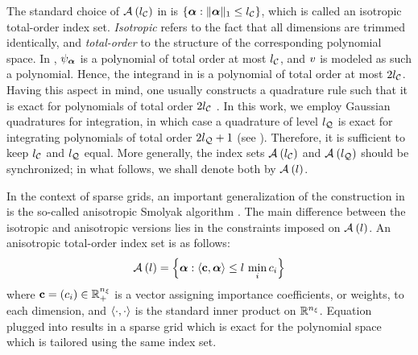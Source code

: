The standard choice of $\multiindexSet{\nclevel}$ in  is $\{ \multiindex: \norm[1]{\multiindex} \leq \nclevel \}$, which is called an isotropic total-order index set.
\emph{Isotropic} refers to the fact that all dimensions are trimmed identically, and \emph{total-order} to the structure of the corresponding polynomial space.
In , $\polynomial_{\multiindex}$ is a polynomial of total order at most $\nclevel$, and $\w$ is modeled as such a polynomial.
Hence, the integrand in  is a polynomial of total order at most $2 \nclevel$.
Having this aspect in mind, one usually constructs a quadrature rule such that it is exact for polynomials of total order $2 \nclevel$ \cite{eldred2008}.
In this work, we employ Gaussian quadratures for integration, in which case a quadrature of level $\nqlevel$ is exact for integrating polynomials of total order $2 \nqlevel + 1$ (see ).
Therefore, it is sufficient to keep $\nclevel$ and $\nqlevel$ equal.
More generally, the index sets $\multiindexSet{\nclevel}$ and $\multiindexSet{\nqlevel}$ should be synchronized; in what follows, we shall denote both by $\multiindexSet{\level}$.

In the context of sparse grids, an important generalization of the construction in  is the so-called anisotropic Smolyak algorithm \cite{nobile2008}.
The main difference between the isotropic and anisotropic versions lies in the constraints imposed on $\quadratureMultiindexSet{\level}$.
An anisotropic total-order index set is as follows:
\begin{equation} \elab{anisotropic-total-order-index-set}
  \chaosMultiindexSet{\level} = \left\{ \multiindex: \innerProduct{\dimensionAnisotropy, \multiindex} \leq \level \, \min_i c_i \right\}
\end{equation}
where $\dimensionAnisotropy = (c_i) \in \real^\nvars_+$ is a vector assigning importance coefficients, or weights, to each dimension, and $\innerProduct{\cdot, \cdot}$ is the standard inner product on $\real^\nvars$.
Equation  plugged into  results in a sparse grid which is exact for the polynomial space which is tailored using the same index set.

